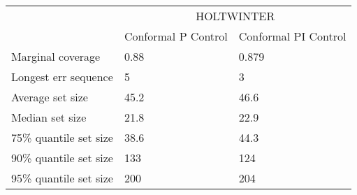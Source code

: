 \begin{tabular}{lll}
\toprule
& \multicolumn{2}{c}{HOLTWINTER} \\
& Conformal P Control & Conformal PI Control \\
\midrule
Marginal coverage & 0.88 & 0.879 \\
Longest err sequence & 5 & 3 \\
Average set size & 45.2 & 46.6 \\
Median set size & 21.8 & 22.9 \\
75\% quantile set size & 38.6 & 44.3 \\
90\% quantile set size & 133 & 124 \\
95\% quantile set size & 200 & 204 \\
\bottomrule
\end{tabular}
